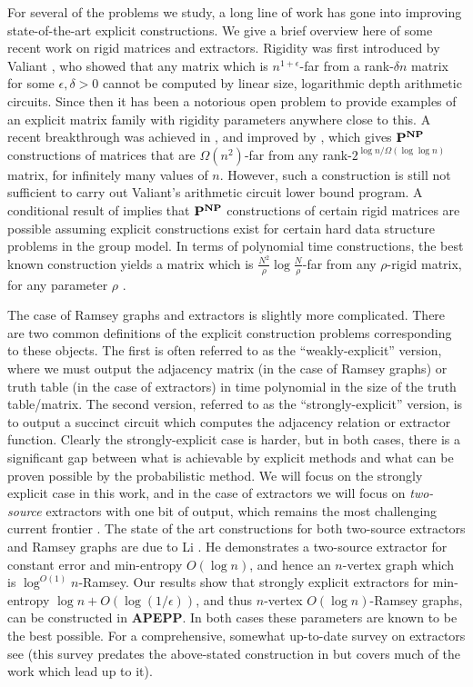 \documentclass[11pt]{article}
\def\cl{\bf}
\begin{document}
For several of the problems we study, a long line of work has gone into improving state-of-the-art explicit constructions. We give a brief overview here of some recent work on rigid matrices and extractors. Rigidity was first introduced by Valiant \cite{Valiant}, who showed that any matrix which is $n^{1+\epsilon}$-far from a rank-$\delta n$ matrix for some $\epsilon, \delta > 0$ cannot be computed by linear size, logarithmic depth arithmetic circuits. Since then it has been a notorious open problem to provide examples of an explicit matrix family with rigidity parameters anywhere close to this. A recent breakthrough was achieved in \cite{alman-chen}, and improved by \cite{pcp-rigidity}, which gives ${\cl P}^{\cl NP}$ constructions of matrices that are $\Omega(n^2)$-far from any rank-$2^{\log n/\Omega(\log \log n)}$ matrix, for infinitely many values of $n$. However, such a construction is still not sufficient to carry out Valiant's arithmetic circuit lower bound program. A conditional result of \cite{data-structure-rigidity} implies that ${\cl P}^{\cl NP}$ constructions of certain rigid matrices are possible assuming explicit constructions exist for certain  hard data structure problems in the group model. In terms of polynomial time constructions, the best known construction yields a matrix which is $\frac{N^2}{\rho}\log{\frac{N}{\rho}}$-far from any $\rho$-rigid matrix, for any parameter $\rho$ \cite{SSS}\cite{Friedman}.

The case of Ramsey graphs and extractors is slightly more complicated. There are two common definitions of the explicit construction problems corresponding to these objects. The first is often referred to as the ``weakly-explicit'' version, where we must output the adjacency matrix (in the case of Ramsey graphs) or truth table (in the case of extractors) in time polynomial in the size of the truth table/matrix. The second version, referred to as the ``strongly-explicit'' version, is to output a succinct circuit which computes the adjacency relation or extractor function. Clearly the strongly-explicit case is harder, but in both cases, there is a significant gap between what is achievable by explicit methods and what can be proven possible by the probabilistic method. We will focus on the strongly explicit case in this work, and in the case of extractors we will focus on \emph{two-source} extractors with one bit of output, which remains the most challenging current frontier \cite{extractors-survey}. The state of the art constructions for both two-source extractors and Ramsey graphs are due to Li \cite{new-li-extractor}. He demonstrates a two-source extractor for constant error and min-entropy $O(\log n)$, and hence an $n$-vertex graph which is $\log^{O(1)}n$-Ramsey. Our results show that strongly explicit extractors for min-entropy $\log n + O(\log(1/\epsilon))$, and thus $n$-vertex $O(\log n)$-Ramsey graphs, can be constructed in {\cl APEPP}. In both cases these parameters are known to be the best possible. For a comprehensive, somewhat up-to-date survey on extractors see \cite{extractors-survey} (this survey predates the above-stated construction in \cite{new-li-extractor} but covers much of the work which lead up to it).
\end{document}
